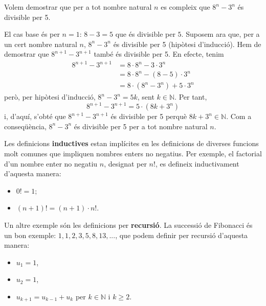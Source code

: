 \begin{exemple}
Volem demostrar que per a tot nombre natural $n$ es compleix que $8^{n}-3^{n} $ és divisible per 5.
\end{exemple}

\begin{solucio}
El cas base és per $n=1$: $8-3=5$ que és divisible per $5$. Suposem
ara que, per a un cert nombre natural $n$, $8^{n}-3^{n}$ és
divisible per 5 (hipòtesi d'inducció). Hem de demostrar que $8^{n+1}-3^{n+1}$ també és divisible per 5. En efecte, tenim\begin{align*}
8^{n+1}-3^{n+1} & =8\cdot8^{n}-3\cdot3^{n} \\
& =8\cdot8^{n}-\left( 8-5\right) \cdot3^{n} \\
& =8\cdot\left( 8^{n}-3^{n}\right) +5\cdot3^{n}
\end{align*}
però, per hipòtesi d'inducció, $8^{n}-3^{n}=5k$, sent $k\in\mathbb{N}$. Per tant,\begin{equation*}
8^{n+1}-3^{n+1}=5\cdot\left( 8k+3^{n}\right)
\end{equation*}
i, d'aquí, s'obté que $8^{n+1}-3^{n+1}$ és divisible per 5 perquè $8k+3^{n}\in\mathbb{N}$. Com a conseqüència, $8^{n}-3^{n}$
és divisible per 5 per a tot nombre natural $n$.
\end{solucio}

Les definicions \textbf{inductives} estan implícites en les definicions
de diverses funcions molt comunes que impliquen nombres enters no negatius.
Per exemple, el factorial d'un nombre enter no negatiu $n$, designat per $n!$, es defineix inductivament d'aquesta manera:

\begin{itemize}
\item $0!=1;$

\item $\left( n+1\right) !=\left( n+1\right) \cdot n!$.
\end{itemize}

Un altre exemple són les definicions per \textbf{recursió}. La successió de Fibonacci és un bon exemple: $1,1,2,3,5,8,13,...$, que podem
definir per recursió d'aquesta manera:

\begin{itemize}
\item $u_{1}=1$,

\item $u_{2}=1$,

\item $u_{k+1}=u_{k-1}+u_{k}$ per $k\in\mathbb{N}$ i $k\geq2$.
\end{itemize}

